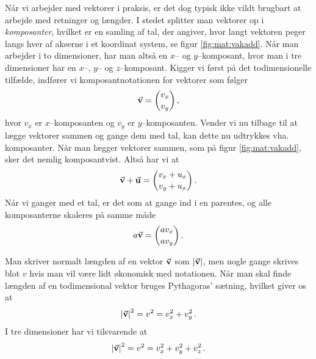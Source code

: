 Når vi arbejder med vektorer i praksis, er det dog typisk ikke vildt brugbart at arbejde med retninger og længder. I stedet splitter man vektorer op i {\em komposanter}, hvilket er en samling af tal, der angiver, hvor langt vektoren peger langs hver af akserne i et koordinat system, se figur \ref{fig:mat:vakadd}. Når man arbejder i to dimensioner, har man altså en $x$-- og $y$--komposant, hvor man i tre dimensioner har en $x$--, $y$-- og $z$--komposant. Kigger vi først på det todimensionelle tilfælde, indfører vi komposantnotationen for vektorer som følger
\begin{equation}
    \va v=\binom{v_x}{v_y} \, ,
\end{equation}
hvor $v_x$ er $x$--komposanten og $v_y$ er $y$--komposanten. Vender vi nu tilbage til at lægge vektorer sammen og gange dem med tal, kan dette nu udtrykkes vha. komposanter. Når man lægger vektorer sammen, som på figur \ref{fig:mat:vakadd}, sker det nemlig komposantvist. Altså har vi at
\begin{equation}
    \va v+\va u=\binom{v_x+u_x}{v_y+u_x} \, .
\end{equation}
Når vi ganger med et tal, er det som at gange ind i en parentes, og alle komposanterne skaleres på samme måde
\begin{equation}
    a\va v=\binom{av_x}{av_y} \, .
\end{equation}

Man skriver normalt længden af en vektor $\va{v}$ som $\abs{\va v}$, men nogle gange skrives blot $v$ hvis man vil være lidt økonomisk med notationen. 
Når man skal finde længden af en todimensional vektor bruges Pythagoras' sætning, hvilket giver os at
\begin{equation}
    \abs{\va v}^2=v^2=v_x^2+v_y^2 \, .\label{pythagoras2}
\end{equation}
I tre dimensioner har vi tilsvarende at
\begin{equation}
    \abs{\va v}^2=v^2=v_x^2+v_y^2+v_z^2 \, .\label{pythagoras3}
\end{equation}

